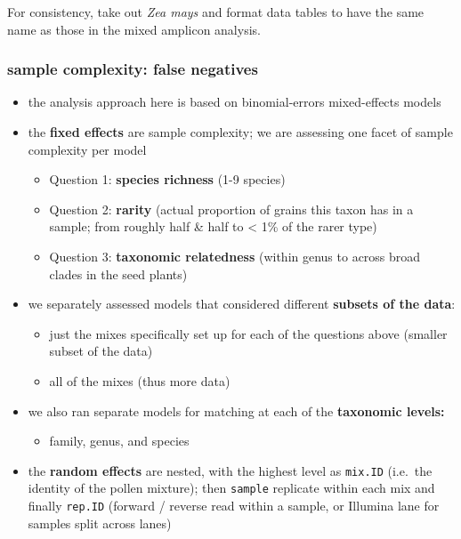 \documentclass[
]{article}
\providecommand{\tightlist}{%
  \setlength{\itemsep}{0pt}\setlength{\parskip}{0pt}}
\begin{document}
For consistency, take out \emph{Zea mays} and format data tables to have
the same name as those in the mixed amplicon analysis.

\hypertarget{sample-complexity-false-negatives}{%
\subsubsection{sample complexity: false
negatives}\label{sample-complexity-false-negatives}}

\begin{itemize}
\tightlist
\item
  the analysis approach here is based on binomial-errors mixed-effects
  models
\item
  the \textbf{fixed effects} are sample complexity; we are assessing one
  facet of sample complexity per model

  \begin{itemize}
  \tightlist
  \item
    Question 1: \textbf{species richness} (1-9 species)
  \item
    Question 2: \textbf{rarity} (actual proportion of grains this taxon
    has in a sample; from roughly half \& half to \textless{} 1\% of the
    rarer type)
  \item
    Question 3: \textbf{taxonomic relatedness} (within genus to across
    broad clades in the seed plants)
  \end{itemize}
\item
  we separately assessed models that considered different
  \textbf{subsets of the data}:

  \begin{itemize}
  \tightlist
  \item
    just the mixes specifically set up for each of the questions above
    (smaller subset of the data)
  \item
    all of the mixes (thus more data)
  \end{itemize}
\item
  we also ran separate models for matching at each of the
  \textbf{taxonomic levels:}

  \begin{itemize}
  \tightlist
  \item
    family, genus, and species
  \end{itemize}
\item
  the \textbf{random effects} are nested, with the highest level as
  \texttt{mix.ID} (i.e.~the identity of the pollen mixture); then
  \texttt{sample} replicate within each mix and finally \texttt{rep.ID}
  (forward / reverse read within a sample, or Illumina lane for samples
  split across lanes)


\end{itemize}
\end{document}

